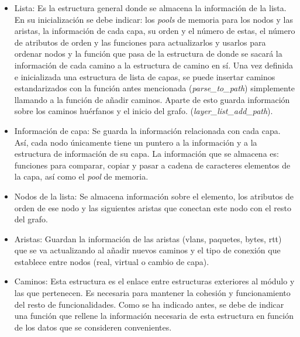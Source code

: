 \documentclass[twoside, 12pt]{epstfg}
\begin{document}
\begin{itemize}
    \item Lista: Es la estructura general donde se almacena la información de la lista. En su inicialización se debe indicar: los \textit{pools} de memoria para los nodos y las aristas, la información de cada capa, su orden y el número de estas, el número de atributos de orden y las funciones para actualizarlos y usarlos para ordenar nodos y la función que pasa de la estructura de donde se sacará la información de cada camino a la estructura de camino en sí. Una vez definida e inicializada una estructura de lista de capas, se puede insertar caminos estandarizados con la función antes mencionada (\textit{parse\_to\_path}) simplemente llamando a la función de añadir caminos.
    Aparte de esto guarda información sobre los caminos huérfanos y el inicio del grafo.
    (\textit{layer\_list\_add\_path}).
    \item Información de capa: Se guarda la información relacionada con cada capa. Así, cada nodo únicamente tiene un puntero a la información y a la estructura de información de su capa. La información que se almacena es: funciones para comparar, copiar y pasar a cadena de caracteres elementos de la capa, así como el \textit{pool} de memoria.
    \item Nodos de la lista: Se almacena información sobre el elemento, los atributos de orden de ese nodo y las siguientes aristas que conectan este nodo con el resto del grafo.
    \item Aristas: Guardan la información de las aristas (vlans, paquetes, bytes, rtt) que se va actualizando al añadir nuevos caminos y el tipo de conexión que establece entre nodos (real, virtual o cambio de capa).
    \item Caminos: Esta estructura es el enlace entre estructuras exteriores al módulo y las que pertenecen. Es necesaria para mantener la cohesión y funcionamiento del resto de funcionalidades. Como se ha indicado antes, se debe de indicar una función que rellene la información necesaria de esta estructura en función de los datos que se consideren convenientes.
\end{itemize}

\end{document}
